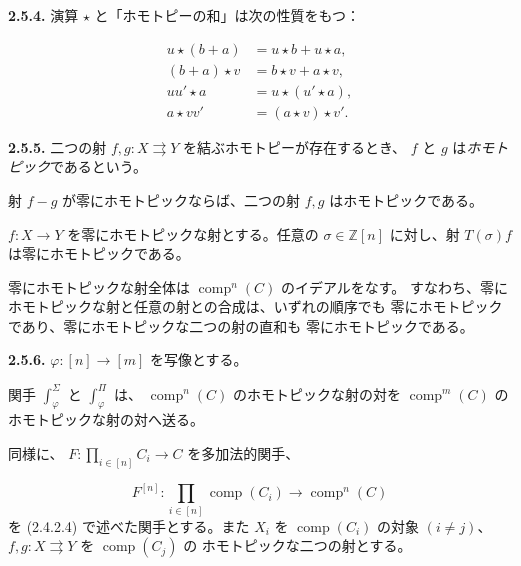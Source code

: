 \clearpage
{}%
\noindent\textbf{2.5.4.}\quad
演算 $\star$ と「ホモトピーの和」は次の性質をもつ：

\begin{equation}
  \begin{aligned}
    u\star(b+a) &= u\star b+u\star a,\\
    (b+a)\star v &= b\star v+a\star v,\\
    uu'\star a &= u\star(u'\star a),\\
    a\star vv' &= (a\star v)\star v'.
  \end{aligned}
  \tag{2.5.4.1}
\end{equation}

\noindent\textbf{2.5.5.}\quad
二つの射 $f,g\colon X\rightrightarrows Y$ を結ぶホモトピーが存在するとき、
$f$ と $g$ は\emph{ホモトピック}であるという。

射 $f-g$ が零にホモトピックならば、二つの射 $f,g$ はホモトピックである。

$f\colon X\longrightarrow Y$ を零にホモトピックな射とする。任意の
$\sigma\in\mathbb Z[n]$ に対し、射 $T(\sigma)f$ は零にホモトピックである。

零にホモトピックな射全体は $\operatorname{comp}^{n}(C)$ のイデアルをなす。
すなわち、零にホモトピックな射と任意の射との合成は、いずれの順序でも
零にホモトピックであり、零にホモトピックな二つの射の直和も
零にホモトピックである。

\noindent\textbf{2.5.6.}\quad
$\varphi\colon[n]\longrightarrow[m]$ を写像とする。

関手 $\int_\varphi^\Sigma$ と $\int_\varphi^\Pi$ は、
$\operatorname{comp}^{n}(C)$ のホモトピックな射の対を
$\operatorname{comp}^{m}(C)$ のホモトピックな射の対へ送る。

同様に、
$F\colon\prod_{i\in[n]}C_i\longrightarrow C$ を多加法的関手、

\begin{equation*}
  F^{[n]}\colon
  \prod_{i\in[n]}\operatorname{comp}(C_i)
  \longrightarrow \operatorname{comp}^{n}(C)
\end{equation*}
を (2.4.2.4) で述べた関手とする。また $X_i$ を
$\operatorname{comp}(C_i)$ の対象 $(i\ne j)$、
$f,g\colon X\rightrightarrows Y$ を $\operatorname{comp}(C_j)$ の
ホモトピックな二つの射とする。

